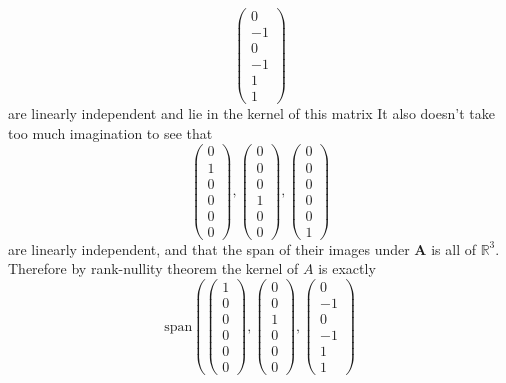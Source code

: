 \documentclass{article}
\newcommand{\chapternumber}{2}
\newenvironment{QandA}{\begin{enumerate}[label=\chapternumber.\arabic*]\bfseries\boldmath}
	{\end{enumerate}}
\newenvironment{answered}{\par\bigskip\normalfont\unboldmath}{}
\begin{document}
\begin{QandA}
\begin{answered}
\[\begin{pmatrix}
				0 \\ -1 \\ 0 \\ -1 \\ 1 \\ 1
			\end{pmatrix}
			\]
			are linearly independent and lie in the kernel of this matrix
			It also doesn't take too much imagination to see that
			\[\begin{pmatrix}
				0 \\ 1 \\ 0 \\ 0 \\ 0 \\ 0
			\end{pmatrix},
			\begin{pmatrix}
				0 \\ 0 \\ 0 \\ 1 \\ 0 \\ 0
			\end{pmatrix},
			\begin{pmatrix}
				0 \\ 0 \\ 0 \\ 0 \\ 0 \\ 1
			\end{pmatrix}
			\]
			are linearly independent, and that the span of their images under  $\textbf{A}$ is all of $\mathbb{R}^3$. Therefore by rank-nullity theorem the kernel of $A$ is exactly
			\[\text{span}\left(
			\begin{pmatrix}
				1 \\ 0 \\ 0 \\ 0 \\ 0 \\ 0
			\end{pmatrix},
			\begin{pmatrix}
				0 \\ 0 \\ 1 \\ 0 \\ 0 \\ 0
			\end{pmatrix},
			\begin{pmatrix}
				0 \\ -1 \\ 0 \\ -1 \\ 1 \\ 1

\end{pmatrix}\]
\end{answered}
\end{QandA}
\end{document}
